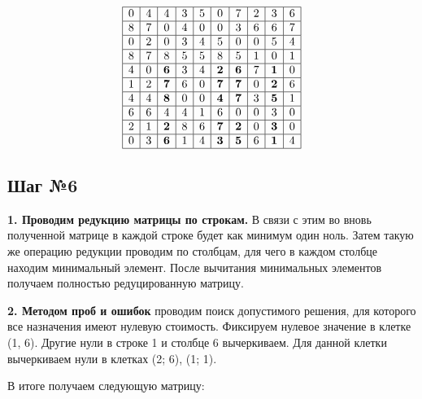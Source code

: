 \documentclass[17pt]{extarticle}
\begin{document}
\[
    \begin{array}{|*{10}{c|}}
        \hline
        0 & 4 & 4          & 3 & 5 & 0          & 7          & 2 & 3          & 6 \\
        \hline
        8 & 7 & 0          & 4 & 0 & 0          & 3          & 6 & 6          & 7 \\
        \hline
        0 & 2 & 0          & 3 & 4 & 5          & 0          & 0 & 5          & 4 \\
        \hline
        8 & 7 & 8          & 5 & 5 & 8          & 5          & 1 & 0          & 1 \\
        \hline
        4 & 0 & \textbf{6} & 3 & 4 & \textbf{2} & \textbf{6} & 7 & \textbf{1} & 0 \\
        \hline
        1 & 2 & \textbf{7} & 6 & 0 & \textbf{7} & \textbf{7} & 0 & \textbf{2} & 6 \\
        \hline
        4 & 4 & \textbf{8} & 0 & 0 & \textbf{4} & \textbf{7} & 3 & \textbf{5} & 1 \\
        \hline
        6 & 6 & 4          & 4 & 1 & 6          & 0          & 0 & 3          & 0 \\
        \hline
        2 & 1 & \textbf{2} & 8 & 6 & \textbf{7} & \textbf{2} & 0 & \textbf{3} & 0 \\
        \hline
        0 & 3 & \textbf{6} & 1 & 4 & \textbf{3} & \textbf{5} & 6 & \textbf{1} & 4 \\
        \hline
    \end{array}
\]

\subsection*{Шаг №6}

\textbf{1. Проводим редукцию матрицы по строкам.} В связи с этим во вновь полученной матрице в каждой строке будет как минимум один ноль.
Затем такую же операцию редукции проводим по столбцам, для чего в каждом столбце находим минимальный элемент.
После вычитания минимальных элементов получаем полностью редуцированную матрицу.

\textbf{2. Методом проб и ошибок} проводим поиск допустимого решения, для которого все назначения имеют нулевую стоимость.
Фиксируем нулевое значение в клетке (1, 6). Другие нули в строке 1 и столбце 6 вычеркиваем. Для данной клетки вычеркиваем нули в клетках (2; 6), (1; 1).

В итоге получаем следующую матрицу:
\end{document}
